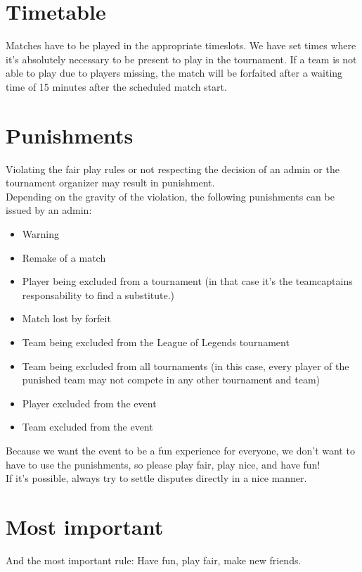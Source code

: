 \documentclass{article}
\begin{document}
\section{Timetable}
Matches have to be played in the appropriate timeslots. We have set times where it's absolutely necessary to be present to play in the tournament. If a team is not able to play due to players missing, the match will be forfaited after a waiting time of 15 minutes after the scheduled match start.

\section{Punishments}
Violating the fair play rules or not respecting the decision of an admin or the tournament organizer may result in punishment.
\\
Depending on the gravity of the violation, the following punishments can be issued by an admin:
\begin{itemize}
	\item Warning
	\item Remake of a match
	\item Player being excluded from a tournament (in that case it's the teamcaptains responsability to find a substitute.)
	\item Match lost by forfeit
	\item Team being excluded from the League of Legends tournament
	\item Team being excluded from all tournaments (in this case, every player of the punished team may not compete in any other tournament and team)
	\item Player excluded from the event
	\item Team excluded from the event
\end{itemize}
Because we want the event to be a fun experience for everyone, we don't want to have to use the punishments, so please play fair, play nice, and have fun!
\\
If it's possible, always try to settle disputes directly in a nice manner.

\section{Most important}
And the most important rule: Have fun, play fair, make new friends.
\end{document}
